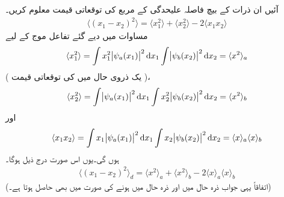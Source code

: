 آئیں ان ذرات کے بیچ فاصلہ علیحدگی کے مربع کی توقعاتی قیمت معلوم کریں۔
\begin{align}
	\langle(x_1-x_2)^2\rangle=\langle x^2_1\rangle+\langle x_2^2\rangle-2\langle x_1x_2\rangle
\end{align}
 مساوات  میں دیے گئے تفاعل موج کے لیے
\begin{align*}
	\langle x_1^2\rangle=\int x_1^2\abs{\psi_a(x_1)}^2\dif x_1\int\abs{\psi_b(x_2)}^2\dif x_2=\langle x^2\rangle_a
\end{align*}
 ( یک ذروی حال  میں  کی توقعاتی قیمت )، 
\begin{align*}
	\langle x_2^2\rangle=\int\abs{\psi_a(x_1)}^2\dif x_1\int x_2^2\abs{\psi_b(x_2)}^2\dif x_2=\langle x^2\rangle_b
\end{align*}
اور
\begin{align*}
	\langle x_1x_2 \rangle=\int x_1\abs{\psi_a(x_1)}^2\dif x_1\int x_2\abs{\psi_b(x_2)}^2\dif x_2=\langle x\rangle_a\langle x \rangle_b
\end{align*}
ہوں گی۔یوں اس صورت درج ذیل ہوگا۔
\begin{align}\label{مساوات_متماثل_قابل_ممیز_فاصلہ}
	\langle(x_1-x_2)^2\rangle_{d}=\langle x^2\rangle_a+\langle x^2 \rangle_b-2\langle x \rangle_a\langle x \rangle_b
\end{align}
(اتفاقاً یہی جواب ذرہ  حال  میں اور ذرہ  حال  میں ہونے کی صورت میں بھی حاصل ہوتا ہے۔)

